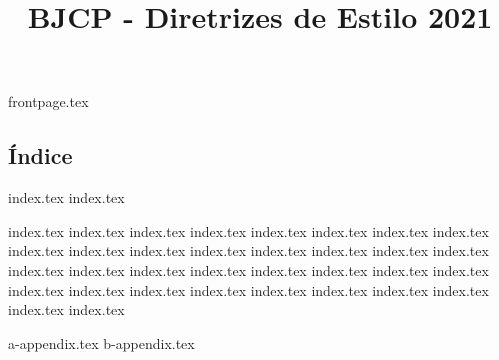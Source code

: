 \documentclass[a4paper, 9t]{article}
\title{BJCP - Diretrizes de Estilo 2021}
\renewcommand*\contentsname{}
\begin{document}
{frontpage.tex}
\begin{multicols}{2}
\section*{Índice}
\renewcommand\contentsname{}
\tableofcontents
\end{multicols}

{index.tex}
{index.tex}

{index.tex}
{index.tex}
{index.tex}
{index.tex}
{index.tex}
{index.tex}
{index.tex}
{index.tex}
{index.tex}
{index.tex}
{index.tex}
{index.tex}
{index.tex}
{index.tex}
{index.tex}
{index.tex}
{index.tex}
{index.tex}
{index.tex}
{index.tex}
{index.tex}
{index.tex}
{index.tex}
{index.tex}
{index.tex}
{index.tex}
{index.tex}
{index.tex}
{index.tex}
{index.tex}
{index.tex}
{index.tex}
{index.tex}
{index.tex}

{a-appendix.tex}
{b-appendix.tex}
\end{document}
